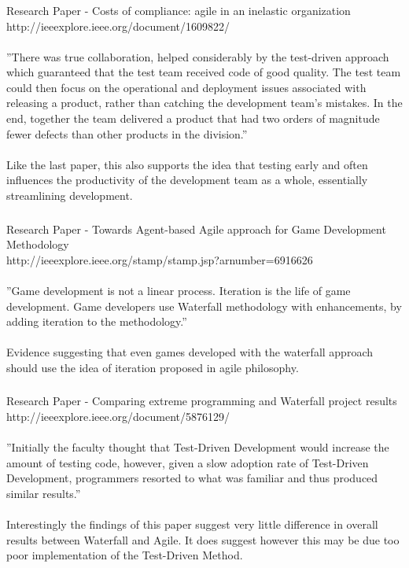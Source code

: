 \documentclass{beamer}
\begin{document}
\begin{frame}
\frametitle{}
Research Paper - Costs of compliance: agile in an inelastic organization
\\http://ieeexplore.ieee.org/document/1609822/
\\~\\
''There was true collaboration, helped considerably by the test-driven approach which guaranteed that the test team received code of good quality. The test team could then focus on the operational and deployment issues associated with releasing a product, rather than catching the development team’s mistakes. In the end, together the team delivered a product that had two orders of magnitude fewer defects than other products in the division.''
\\~\\
Like the last paper, this also supports the idea that testing early and often influences the productivity of the development team as a whole, essentially streamlining development.
\end{frame}

\begin{frame}
\frametitle{}
Research Paper - Towards Agent-based Agile approach for Game Development Methodology
\\http://ieeexplore.ieee.org/stamp/stamp.jsp?arnumber=6916626\\~\\

''Game development is not a linear process. Iteration is the life of game development. Game developers use Waterfall methodology with enhancements, by adding iteration to the methodology.''
\\~\\
Evidence suggesting that even games developed with the waterfall approach should use the idea of iteration proposed in agile philosophy.
\end{frame}

\begin{frame}
\frametitle{}
Research Paper - Comparing extreme programming and Waterfall project results
\\http://ieeexplore.ieee.org/document/5876129/\\~\\

''Initially the faculty thought that Test-Driven Development would increase the amount of testing code, however, given a slow adoption rate of Test-Driven Development, programmers resorted to what was familiar and thus produced similar results.''
\\~\\
Interestingly the findings of this paper suggest very little difference in overall results between Waterfall and Agile. It does suggest however this may be due too poor implementation of the Test-Driven Method.
\end{frame}
\end{document}
